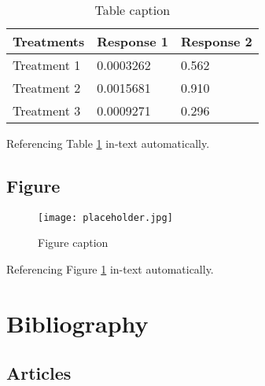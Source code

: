 \documentclass[11pt,fleqn]{book} %
\begin{document}
\begin{table}[h]
\centering
\begin{tabular}{l l l}
\toprule
\textbf{Treatments} & \textbf{Response 1} & \textbf{Response 2}\\
\midrule
Treatment 1 & 0.0003262 & 0.562 \\
Treatment 2 & 0.0015681 & 0.910 \\
Treatment 3 & 0.0009271 & 0.296 \\
\bottomrule
\end{tabular}
\caption{Table caption}
\label{tab:example} %
\end{table}

Referencing Table \ref{tab:example} in-text automatically.


\section{Figure}

\begin{figure}[h]
\centering\texttt{[image: placeholder.jpg]}
\caption{Figure caption}
\label{fig:placeholder} %
\end{figure}

Referencing Figure \ref{fig:placeholder} in-text automatically.


\chapter*{Bibliography}


\section*{Articles}
\printbibliography[heading=bibempty,type=article]
\end{document}
